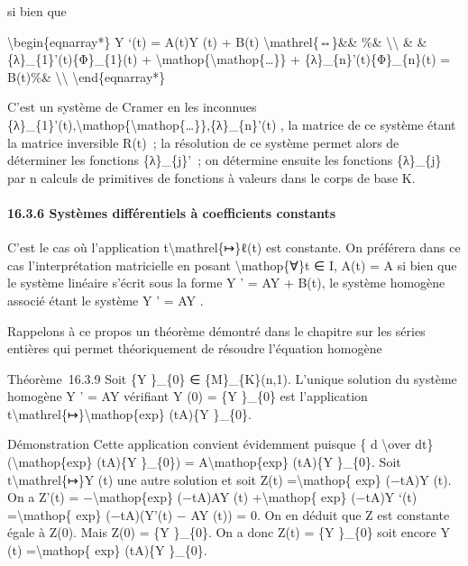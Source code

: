 \documentclass[]{article}
\begin{document}
si bien que

\textbackslash{}begin\{eqnarray*\} Y `(t) = A(t)Y (t) + B(t)
\textbackslash{}mathrel\{⇔\}\&\& \%\& \textbackslash{}\textbackslash{}
\& \& \{λ\}\_\{1\}'(t)\{Φ\}\_\{1\}(t) +
\textbackslash{}mathop\{\textbackslash{}mathop\{\ldots{}\}\} +
\{λ\}\_\{n\}'(t)\{Φ\}\_\{n\}(t) = B(t)\%\&
\textbackslash{}\textbackslash{} \textbackslash{}end\{eqnarray*\}

C'est un système de Cramer en les inconnues
\{λ\}\_\{1\}'(t),\textbackslash{}mathop\{\textbackslash{}mathop\{\ldots{}\}\},\{λ\}\_\{n\}'(t)
, la matrice de ce système étant la matrice inversible R(t)~; la
résolution de ce système permet alors de déterminer les fonctions
\{λ\}\_\{j\}'~; on détermine ensuite les fonctions \{λ\}\_\{j\} par n
calculs de primitives de fonctions à valeurs dans le corps de base K.

\paragraph{16.3.6 Systèmes différentiels à coefficients constants}

C'est le cas où l'application t\textbackslash{}mathrel\{↦\}ℓ(t) est
constante. On préférera dans ce cas l'interprétation matricielle en
posant \textbackslash{}mathop\{∀\}t ∈ I, A(t) = A si bien que le système
linéaire s'écrit sous la forme Y ' = AY + B(t), le système homogène
associé étant le système Y ' = AY .

Rappelons à ce propos un théorème démontré dans le chapitre sur les
séries entières qui permet théoriquement de résoudre l'équation homogène

Théorème~16.3.9 Soit \{Y \}\_\{0\} ∈ \{M\}\_\{K\}(n,1). L'unique
solution du système homogène Y ' = AY vérifiant Y (0) = \{Y \}\_\{0\}
est l'application
t\textbackslash{}mathrel\{↦\}\textbackslash{}mathop\{exp\} (tA)\{Y
\}\_\{0\}.

Démonstration Cette application convient évidemment puisque \{ d
\textbackslash{}over dt\} (\textbackslash{}mathop\{exp\} (tA)\{Y
\}\_\{0\}) = A\textbackslash{}mathop\{exp\} (tA)\{Y \}\_\{0\}. Soit
t\textbackslash{}mathrel\{↦\}Y (t) une autre solution et soit Z(t)
=\textbackslash{}mathop\{ exp\} (−tA)Y (t). On a Z'(t) =
−\textbackslash{}mathop\{exp\} (−tA)AY (t) +\textbackslash{}mathop\{
exp\} (−tA)Y `(t) =\textbackslash{}mathop\{ exp\} (−tA)(Y'(t) − AY (t))
= 0. On en déduit que Z est constante égale à Z(0). Mais Z(0) = \{Y
\}\_\{0\}. On a donc Z(t) = \{Y \}\_\{0\} soit encore Y (t)
=\textbackslash{}mathop\{ exp\} (tA)\{Y \}\_\{0\}.
\end{document}
